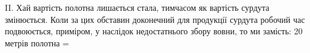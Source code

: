 II. Хай вартість полотна лишається стала, тимчасом як вартість
сурдута змінюється. Коли за цих обставин доконечний для
продукції сурдута робочий час подвоюється, приміром, у наслідок
недостатнього збору вовни, то ми замість: 20 метрів полотна =
\parbreak{}  %
